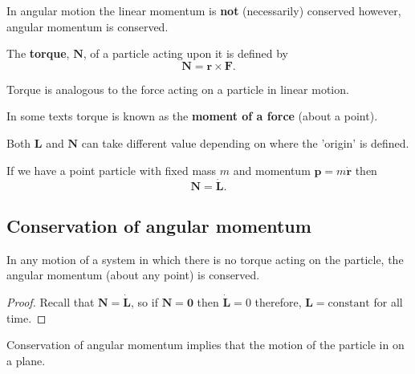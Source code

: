 \documentclass[12pt, a4paper]{article}
\begin{document}
\begin{mdremark}
    In angular motion the linear momentum is \textbf{not} (necessarily) conserved however, angular momentum is conserved.
\end{mdremark}

\begin{definition}
    The \textbf{torque}, \(\bm{N}\), of a particle acting upon it is defined by
    \[\bm{N}=\bm{r} \times \bm{F}.\]
\end{definition}

\begin{mdnote}
    Torque is analogous to the force acting on a particle in linear motion.
\end{mdnote}

\begin{mdremark}
    In some texts torque is known as the \textbf{moment of a force} (about a point).
\end{mdremark}

\begin{mdremark}
    Both \(\bm{L}\) and \(\bm{N}\) can take different value depending on where the 'origin' is defined.
\end{mdremark}

\begin{mdthm}
    If we have a point particle with fixed mass \(m\) and momentum \(\bm{p}=m\dot{\bm{r}}\) then
    \[\bm{N}=\dot{\bm{L}}.\]
\end{mdthm}

\subsection{Conservation of angular momentum}

\begin{mdthm}
    In any motion of a system in which there is no torque acting on the particle, the angular momentum (about any point) is conserved.
\end{mdthm}

\begin{proof}
    Recall that \(\bm{N}=\dot{\bm{L}}\), so if \(\bm{N}=\bm{0}\) then \(\dot{\bm{L}} = 0\) therefore, \(\bm{L}=\text{constant}\) for all time.
\end{proof}

\begin{mdcor}
    Conservation of angular momentum implies that the motion of the particle in on a plane.
\end{mdcor}
\end{document}

